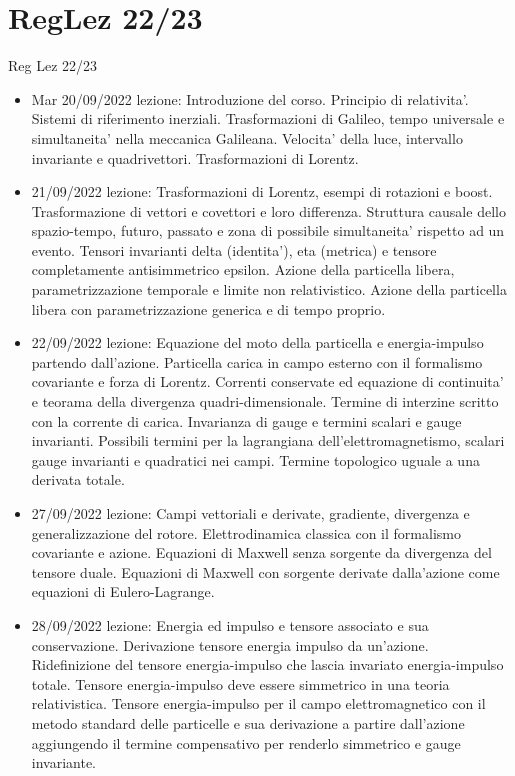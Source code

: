 \section{RegLez 22/23}
\begin{frame}[allowframebreaks]{Reg Lez 22/23}
\begin{itemize}
\item Mar 20/09/2022 lezione: Introduzione del corso. Principio di relativita'. Sistemi di riferimento inerziali. Trasformazioni di Galileo, tempo universale e simultaneita' nella meccanica Galileana. Velocita' della luce, intervallo invariante e quadrivettori. Trasformazioni di Lorentz.
\item 21/09/2022 lezione: Trasformazioni di Lorentz, esempi di rotazioni e boost. Trasformazione di vettori e covettori e loro differenza. Struttura causale dello spazio-tempo, futuro, passato e zona di possibile simultaneita' rispetto ad un evento. Tensori invarianti delta (identita'), eta (metrica) e tensore completamente antisimmetrico epsilon. Azione della particella libera, parametrizzazione temporale e limite non relativistico. Azione della particella libera con parametrizzazione generica e di tempo proprio.
\item 22/09/2022 lezione: Equazione del moto della particella e energia-impulso partendo dall'azione. Particella carica in campo esterno con il formalismo covariante e forza di Lorentz. Correnti conservate ed equazione di continuita' e teorama della divergenza quadri-dimensionale. Termine di interzine scritto con la corrente di carica. Invarianza di gauge e termini scalari e gauge invarianti. Possibili termini per la lagrangiana dell'elettromagnetismo, scalari gauge invarianti e quadratici nei campi. Termine topologico uguale a una derivata totale.
\item 27/09/2022 lezione: Campi vettoriali e derivate, gradiente, divergenza e generalizzazione del rotore. Elettrodinamica classica con il formalismo covariante e azione. Equazioni di Maxwell senza sorgente da divergenza del tensore duale. Equazioni di Maxwell con sorgente derivate dalla'azione come equazioni di Eulero-Lagrange.
\item 28/09/2022 lezione: Energia ed impulso e tensore associato e sua conservazione. Derivazione tensore energia impulso da un'azione. Ridefinizione del tensore energia-impulso che lascia invariato energia-impulso totale. Tensore energia-impulso deve essere simmetrico in una teoria relativistica. Tensore energia-impulso per il campo elettromagnetico con il metodo standard delle particelle e sua derivazione a partire dall'azione aggiungendo il termine compensativo per renderlo simmetrico e gauge invariante.

\end{itemize}
\end{frame}
